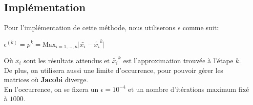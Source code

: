 \subsection{Implémentation}
Pour l'implémentation de cette méthode, nous utiliserons $\epsilon$ comme suit: \\
\begin{center}
$\epsilon^{(k)} = p^k = \text{Max}_{i=1,\ldots, n} \vert \bar{x_i} -\tilde{x_i}^k \vert $ \\
\end{center}
Où $\bar{x_i}$ sont les résultats attendus et $\tilde{x_i}^k$ est l'approximation trouvée à l'étape $k$. \\
De plus, on utilisera aussi une limite d'occurrence, pour pouvoir gérer les matrices où \textbf{Jacobi} diverge.\\
En l'occurrence, on se fixera un $\epsilon = 10^{-4}$ et un nombre d'itérations maximum fixé à $1000$.
\newpage
